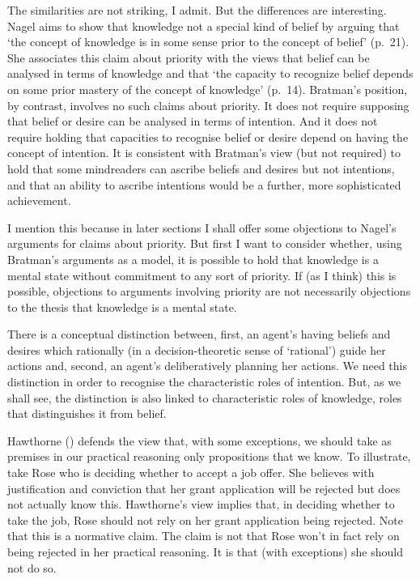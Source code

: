 \documentclass[11pt,a4paper]{extarticle}
\begin{document}
The similarities are not striking, I admit.
But the differences are interesting.
Nagel aims to show that knowledge not a special kind of belief by arguing that `the concept of knowledge is in some sense prior to the concept of belief' (p.\ 21).
She associates this 
claim about priority 
with the views 
that belief can be analysed in terms of knowledge 
and 
that `the capacity to recognize belief depends on some prior mastery of the concept of knowledge' (p.\ 14).
Bratman's position, 
by contrast, 
involves no such claims about priority.
It does not require supposing that belief or desire can be analysed in terms of intention.
And it does not require holding that capacities to recognise belief or desire depend on having the concept of intention.
It is consistent with Bratman's view 
(but not required) 
to hold that 
some mindreaders can ascribe beliefs and desires but not intentions,
and that 
an ability to ascribe intentions would be a further, more sophisticated achievement.

I mention this because in later sections I shall offer some objections to Nagel's arguments for claims about priority.
But first I want to
consider whether, using Bratman's arguments as a model,
it is possible to  hold that
 knowledge is a mental state 
without
commitment to any sort of priority.
If (as I think) this is possible, 
objections to arguments involving priority 
are not necessarily
objections to the thesis that knowledge is a mental state.


There is a conceptual distinction between,
first,
an agent's having beliefs and desires which rationally 
(in a decision-theoretic sense of `rational') 
guide her actions
and,
second,
 an agent's deliberatively planning her actions.
We need this distinction in order to recognise the characteristic roles of intention.
But, as we shall see, the distinction is also linked to characteristic roles of knowledge, roles that distinguishes it from belief.

Hawthorne (\citeyear[pp.\ 29--31]{Hawthorne:2004ov}) defends the view that, with some exceptions, we should take as premises in our practical reasoning only propositions that we know.  
To illustrate, take Rose who is deciding whether to accept a job offer.
She believes with justification and conviction that her grant application will be rejected but does not actually know this.  
Hawthorne's view implies that, in deciding whether to take the job, Rose should not rely on her grant application being rejected.  
Note that this is a normative claim.  
The claim is not that Rose won't in fact rely on being rejected in her practical reasoning.  
It is that (with exceptions) she should not do so.  
\end{document}
